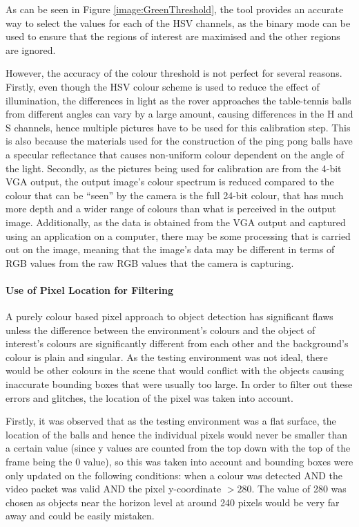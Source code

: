 \documentclass[a4paper]{article}
\begin{document}
As can be seen in Figure \ref{image:GreenThreshold}, the tool provides an accurate way to select the values 
for each of the HSV channels, as the binary mode can be used to ensure that the regions
of interest are maximised and the other regions are ignored. 

However, the accuracy of the colour threshold is not perfect for several reasons.
Firstly, even though the HSV colour scheme is used to reduce the effect of illumination, 
the differences in light as the rover approaches the table-tennis balls from different angles
can vary by a large amount, causing differences in the H and S channels, 
hence multiple pictures have to be used for this calibration step. This is also
because the materials used for the construction of the ping pong balls have a specular 
reflectance that causes non-uniform colour dependent on the angle of the light. 
Secondly, as the pictures being used for calibration are from the 4-bit VGA output, 
the output image's colour spectrum is reduced compared to the colour that can be
 ``seen'' by the camera is the full 24-bit colour, that has much more depth and 
a wider range of colours than what is perceived in the output image. Additionally, 
as the data is obtained from the VGA output and captured using an application on 
a computer, there may be some processing that is carried out on the image, meaning 
that the image's data may be different in terms of RGB values from the raw RGB values
that the camera is capturing.

\paragraph*{Use of Pixel Location for Filtering}
\vspace{-6pt}

A purely colour based pixel approach to object detection has significant flaws unless
the difference between the environment's colours and the object of interest's colours 
are significantly different from each other and the background's colour is plain and
singular. As the testing environment was not ideal, there would be other colours
in the scene that would conflict with the objects causing inaccurate bounding boxes that
were usually too large. In order to filter out these errors and glitches, the 
location of the pixel was taken into account.

Firstly, it was observed that as the testing environment was a flat surface, the 
location of the balls and hence the individual pixels would never be smaller than 
a certain value (since y values are counted from the top down with the top of 
the frame being the 0 value), so this was taken into account and bounding boxes
were only updated on the following conditions: when a colour was detected AND the
video packet was valid AND the pixel y-coordinate \(> 280\). The value of 280 was 
chosen as objects near the horizon level at around 240 pixels would be very far 
away and could be easily mistaken.
\end{document}
